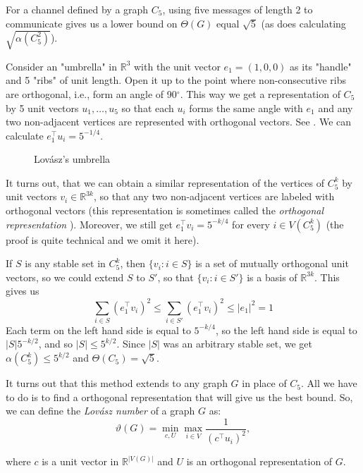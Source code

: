 For a channel defined by a graph $C_5$, using five messages of length 2 to communicate gives us a lower bound on $\Theta(G)$ equal $\sqrt{5}$ (as does calculating $\sqrt{\alpha(C_5^2)}$).

Consider an "umbrella" in $\mathbb{R}^3$ with the unit vector $e_1 = (1, 0, 0)$ as its "handle" and 5 "ribs" of unit length.  Open it up to the point where non-consecutive ribs are orthogonal, i.e., form an angle of 90$^\circ$. This way we get a representation of $C_5$ by 5 unit vectors $u_1, \ldots, u_5$ so that each $u_i$ forms the same angle with $e_1$ and any two non-adjacent vertices are represented with orthogonal vectors. See . We can calculate $e_1^\intercal u_i = 5 ^ {-1/4}$.


\begin{wrapfigure}{r}{0.4\textwidth}
  
  \caption{Lovász's umbrella}
  \label{fig:umbrella}
\end{wrapfigure}

It turns out, that we can obtain a similar representation of the vertices of $C_5^k$ by unit vectors $v_i \in \mathbb{R}^{3k}$, so that any two non-adjacent vertices are labeled with orthogonal vectors (this representation is sometimes called the \emph{orthogonal representation} \cite{Lovsz1989Orthogonal}). Moreover, we still get $e_1^\intercal v_i = 5^{-k/4}$ for every $i \in V(C_5^k)$ (the proof is quite technical and we omit it here).

If $S$ is any stable set in $C_5^k$, then $\{v_i: i \in S\}$ is a set of mutually orthogonal unit vectors, so we could extend $S$ to $S'$, so that $\{v_i: i \in S'\}$ is a basis of $\mathbb{R}^{3k}$. This gives us
$$\sum\limits_{i\in S}(e_1^\intercal v_i)^2 \leq \sum\limits_{i \in S'}(e_1^\intercal v_i)^2 \leq |e_1|^2 = 1$$
Each term on the left hand side is equal to $5^{-k/4}$, so the left hand side is equal to $|S|5^{-k/2}$, and so $|S| \leq 5^{k/2}$. Since $|S|$ was an arbitrary stable set, we get $\alpha(C_5^k) \leq 5 ^{k/2}$ and $\Theta(C_5) = \sqrt{5}$.

It turns out that this method extends to any graph $G$ in place of $C_5$. All we have to do is to find a orthogonal representation that will give us the best bound. So, we can define the \emph{Lovász number} of a graph $G$ as:
$$\vartheta(G) = \min\limits_{c,U} \max\limits_{i\in V} \frac{1}{(c^\intercal u_i)^2},$$

\noindent where $c$ is a unit vector in $\mathbb{R}^{|V(G)|}$ and $U$ is an orthogonal representation of $G$.

